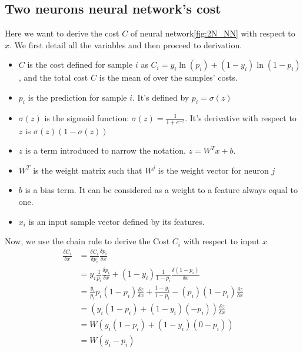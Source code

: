 
\begin{appendices}
	\section{Two neurons neural network's cost}
	\label{sec:2N_NN_cost}
		Here we want to derive the cost $C$ of neural network\ref{fig:2N_NN} with respect to $x$. We first detail all the variables and then proceed to derivation.
		\begin{itemize}
			\item $C$ is the cost defined for sample $i$ as $C_i = y_i \ln(p_i) + (1-y_i)\ln(1-p_i)$, and the total cost $C$ is the mean of over the samples' costs.
			\item $p_i$ is the prediction for sample $i$. It's defined by $p_i = \sigma(z)$
			\item $\sigma(z)$ is the sigmoid function: $\sigma(z) = \frac{1}{1 + e^{-z}}$. It's derivative with respect to $z$ is $\sigma(z)(1-\sigma(z))$
			\item $z$ is a term introduced to narrow the notation. $z=W^Tx+b$.
			\item $W^T$ is the weight matrix such that $W^j$ is the weight vector for neuron $j$
			\item $b$ is a bias term. It can be considered as a weight to a feature always equal to one.
			\item $x_i$ is an input sample vector defined by its features.
		\end{itemize}
		Now, we use the chain rule to derive the Cost $C_i$ with respect to input $x$
		\begin{equation}
			\begin{split}
				\frac{\delta C_i}{\delta x} &= \frac{\delta C_i}{\delta p_i} \frac{\delta p_i}{\delta x} \\
				&= y_i \frac{1}{p_i} \frac{\delta p_i}{\delta x} + (1-y_i)\frac{1}{1-p_i} \frac{\delta (1-p_i)}{\delta x} \\
				&= \frac{y_i}{p_i} p_i(1-p_i)\frac{\delta z}{\delta x} + \frac{1-y_i}{1-p_i} -(p_i)(1-p_i) \frac{\delta z}{\delta x} \\
				&= \left( y_i (1-p_i) + (1-y_i) (-p_i)   \right) \frac{\delta z}{\delta x} \\
				&= W \left( y_i (1-p_i) + (1-y_i) (0-p_i)  \right)  \\
				&= W \left( y_i -p_i                       \right)
			\end{split}
		\end{equation}
\end{appendices}
		